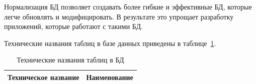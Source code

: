 Нормализация БД позволяет создавать более гибкие и эффективные БД, которые легче обновлять и модифицировать.
В результате это упрощает разработку приложений, которые работают с такими БД.

Технические названия таблиц в базе данных приведены в таблице~\ref{tab:db_table_name}.

\begin{table}[!htb]
    \centering\small

    \caption{Технические названия таблиц в БД}
    \label{tab:db_table_name}

    \begin{tabular}{|p{6cm}|p{11cm}|}
        \hline
        \multicolumn{1}{|c|}{Техническое название}
        & \multicolumn{1}{c|}{Наименование}
        \\ \hline


\end{tabular}
\end{table}
